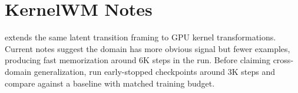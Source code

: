 \section{KernelWM Notes}
\label{app:kernelwm}

\KernelWM{} extends the same latent transition framing to GPU kernel
transformations.  Current notes suggest the domain has more obvious
signal but fewer examples, producing fast memorization around 6K steps in
the  run.  Before claiming cross-domain
generalization, run early-stopped checkpoints around 3K steps and compare
against a baseline with matched training budget.
